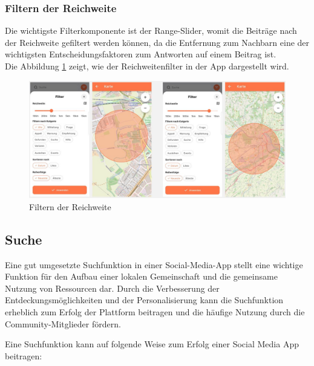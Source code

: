 \subsubsection{Filtern der Reichweite}

Die wichtigste Filterkomponente ist der Range-Slider, womit die Beiträge nach der Reichweite gefiltert werden können, da die Entfernung zum Nachbarn eine der wichtigsten Entscheidungsfaktoren zum Antworten auf einem Beitrag ist.
\\
Die Abbildung \ref{fig:range-filter} zeigt, wie der Reichweitenfilter in der App dargestellt wird.

\begin{figure}[H]
  \centering
  \includegraphics[width=\textwidth]{pics/range-filter.JPG}
  \caption{Filtern der Reichweite}
  \label{fig:range-filter}
\end{figure}

\subsection{Suche}

Eine gut umgesetzte Suchfunktion in einer Social-Media-App stellt eine wichtige Funktion für den Aufbau einer lokalen Gemeinschaft und die gemeinsame Nutzung von Ressourcen dar. Durch die Verbesserung der Entdeckungsmöglichkeiten und der Personalisierung kann die Suchfunktion erheblich zum Erfolg der Plattform beitragen und die häufige Nutzung durch die Community-Mitglieder fördern.

Eine Suchfunktion kann auf folgende Weise zum Erfolg einer Social Media App beitragen:

